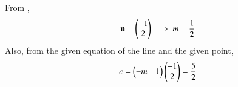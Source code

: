 From ,
\begin{align}
	\mathbf{n} = \begin{pmatrix}-1\\2\end{pmatrix} \implies m = \frac{1}{2}
\end{align}
Also, from the given equation of the line and the given point, 
\begin{align}
	c = \begin{pmatrix}-m & 1\end{pmatrix}\begin{pmatrix}-1\\2\end{pmatrix} = 
\frac{5}{2}  
\end{align}

